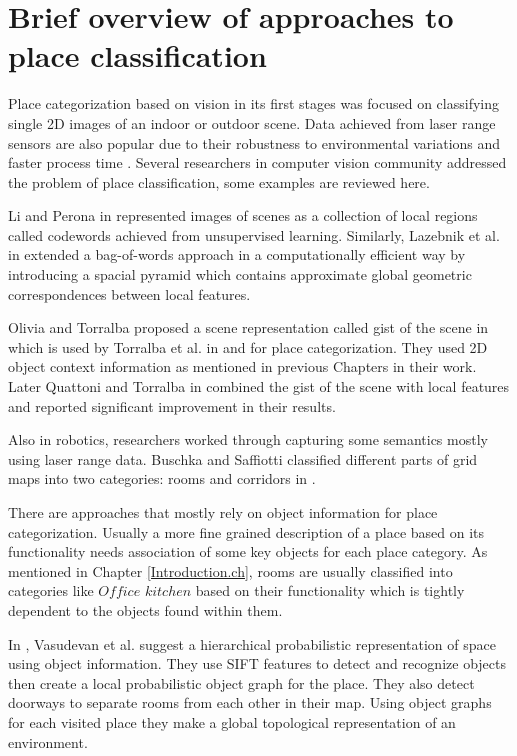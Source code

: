 \section{Brief overview of approaches to place classification}
\label{OverviewPlaceClassification.sec}
 Place categorization based on vision in its first stages was focused on classifying single 2D images of an indoor or 
 outdoor scene.
 Data achieved from laser range sensors are also popular due to their robustness to environmental variations and faster process time
 .\cite{pronobis2011phd}
 Several researchers in computer vision community addressed the problem of place classification, some examples are 
 reviewed here.
 
 Li and Perona in \cite{Li:2005:BHM:1068508.1069129} represented images of scenes as a collection of local regions 
 called codewords achieved from unsupervised learning. 
 Similarly, Lazebnik et al. in \cite{1641019} extended a bag-of-words approach in a computationally efficient way
 by introducing a spacial pyramid which contains approximate global geometric correspondences between local features.
  
 Olivia and Torralba proposed a scene representation called gist of the scene in \cite{oliva2006building} which is 
 used by Torralba et al. in \cite{TorralbaContextualPriming} and \cite{TrollbaContexBased} for place categorization.
 They used 2D object context information as mentioned in previous Chapters in their work.
 Later Quattoni and Torralba in \cite{quattoni2009recognizing} combined the gist of the scene with local features and 
 reported significant improvement in their results.
 
 Also in robotics, researchers worked through capturing some semantics mostly using laser range data.
 Buschka and Saffiotti classified different parts of grid maps into two categories: rooms and corridors in \cite{buschka2002virtual}. 
 
 There are approaches that mostly rely on object information for place categorization.
 Usually a more fine grained description of a place based on its functionality needs association of some key objects 
 for each place category.
 As mentioned in Chapter \ref{Introduction.ch}, rooms are usually classified into categories like $Office$ $kitchen$ based on 
 their functionality which is tightly dependent to the objects found within them.
 
In \cite{Vasudevan2007359}, Vasudevan et al. suggest a hierarchical probabilistic representation of space using object
information. 
They use SIFT features to detect and recognize objects then create a local probabilistic object graph for the place. 
They also detect doorways to separate rooms from each other in their map. 
Using object graphs for each visited place they make a global topological representation of an environment.

